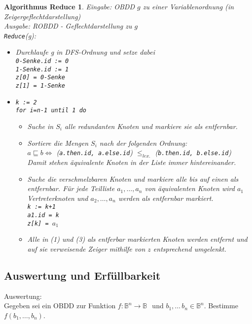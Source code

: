 \documentclass[ngerman]{scrartcl}
\theoremstyle{custom}
\newtheorem{algred}[mdef]{Algorithmus Reduce}
\newcommand{\0}{\mathbf{0}}
\newcommand{\1}{\mathbf{L}}
\newcommand{\bol}{\mathds{B}^n \rightarrow \mathds{B}}
\newcommand{\bolf}{$f: \bol~$}
\begin{document}
\begin{algred}
  Eingabe: OBDD $g$ zu einer Variablenordnung (in
  Zeigergeflechtdarstellung)\\
  Ausgabe: ROBDD - Geflechtdarstellung zu $g$ \\

  \texttt{Reduce}(g):
  \begin{itemize}
  \item[(1)] Durchlaufe g in DFS-Ordnung und setze dabei\\
      \lstinline{0-Senke.id := 0}\\
      \lstinline{1-Senke.id := 1}\\
      \lstinline{z[0] = 0-Senke}\\
      \lstinline{z[1] = 1-Senke}
 \item[(2)] \lstinline{k := 2}\\
      \lstinline{for i=n-1 until 1 do}
      \begin{itemize}  
      \item[(1)] Suche in $S_i$ alle redundanten Knoten und markiere sie als
entfernbar.
      \item[(2)] Sortiere die Mengen $S_i$ nach der folgenden Ordnung:\\
      $a \sqsubseteq b \Leftrightarrow$ (\lstinline{a.then.id, a.else.id})
           $\leq_{lex.}$ (\lstinline{b.then.id, b.else.id})\\
      Damit stehen \"aquivalente Knoten in der Liste immer
      hintereinander.
      \item[(3)] Suche die verschmelzbaren Knoten und markiere alle
        bis auf einen als entfernbar. F\"ur jede Teilliste
        $a_1,\dots,a_n$ von \"aquivalenten Knoten wird $a_1$
        Vertreterknoten und $a_2,\dots,a_n$ werden als entfernbar
        markiert.\\
        \lstinline{k := k+1}\\
        \lstinline{a1.id = k}\\
        \lstinline{z[k] = }$a_1$
        \item[(4)] Alle in (1) und (3) als entferbar markierten Knoten
          werden entfernt und auf sie verweisende Zeiger mithilfe von
          $z$ entsprechend umgelenkt.
    \end{itemize}
  \end{itemize}  
\end{algred}

\subsection{Auswertung und Erf\"ullbarkeit}
Auswertung:\\
Gegeben sei ein OBDD zur Funktion \bolf ~und $b_1,\dots\,b_n \in
\mathds{B}^n$. Bestimme $f(b_1,\dots,b_n)$.\\
\end{document}
